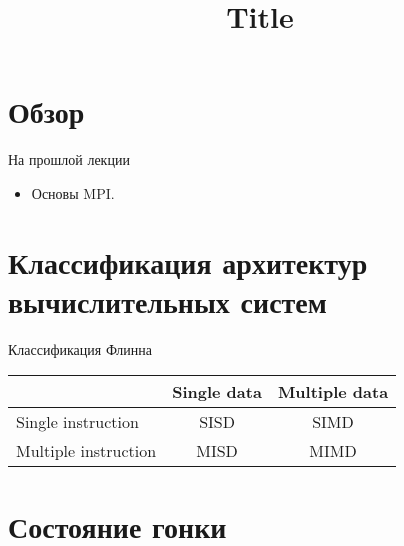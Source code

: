 

\title{Title}



\begin{frame}
\titlepage
\end{frame}

\section{Обзор}

\begin{frame}
\tableofcontents
\end{frame} 

\begin{frame}{На прошлой лекции}

\begin{itemize}
    \item Основы MPI.
\end{itemize}

\end{frame}

\section{Классификация архитектур вычислительных систем}

\begin{frame}{Классификация Флинна}

\begin{table}[htp]
    \begin{center}
    \begin{tabular}{|l|c|c|}
        \hline
                                & Single data   & Multiple data \\
        \hline
        Single instruction      & SISD          & SIMD \\
        \hline
        Multiple instruction    & MISD          & MIMD \\
        \hline
    \end{tabular}
    \end{center}
\end{table}

\end{frame}

\section{Состояние гонки}


